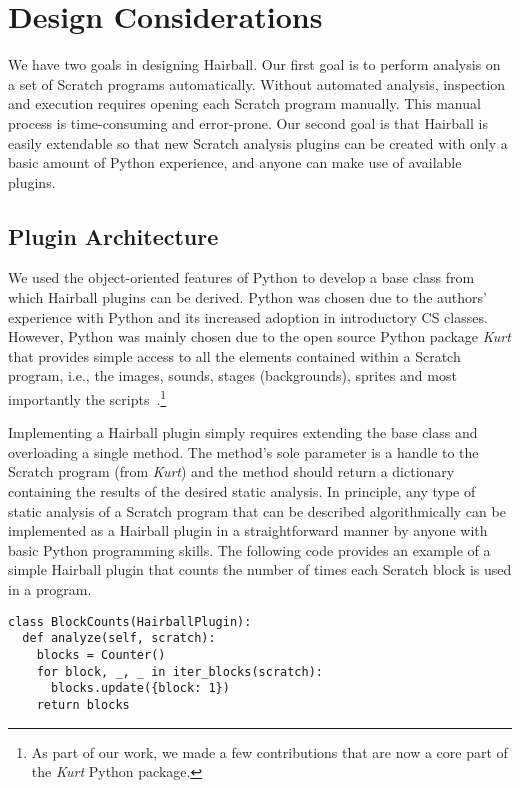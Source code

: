 \section{Design Considerations}

We have two goals in designing Hairball. Our first goal is to perform analysis
on a set of Scratch programs automatically. Without automated analysis,
inspection and execution requires opening each Scratch program manually. This
manual process is time-consuming and error-prone.  Our second goal is that
Hairball is easily extendable so that new Scratch analysis plugins can be
created with only a basic amount of Python experience, and anyone can make use
of available plugins.


\subsection*{Plugin Architecture}
We used the object-oriented features of Python to develop a base class from
which Hairball plugins can be derived. Python was chosen due to the authors'
experience with Python and its increased adoption in introductory CS
classes. However, Python was mainly chosen due to the open source Python
package \emph{Kurt} that provides simple access to all the elements contained
within a Scratch program, i.e., the images, sounds, stages (backgrounds),
sprites and most importantly the scripts~\cite{Radvan:2012:Online}.\footnote{As
  part of our work, we made a few contributions that are now a core part of the
  \emph{Kurt} Python package.}

Implementing a Hairball plugin simply requires extending the base class and
overloading a single method. The method's sole parameter is a handle to the
Scratch program (from \emph{Kurt}) and the method should return a dictionary
containing the results of the desired static analysis. In principle, any type
of static analysis of a Scratch program that can be described algorithmically
can be implemented as a Hairball plugin in a straightforward manner by anyone
with basic Python programming skills. The following code provides an example of
a simple Hairball plugin that counts the number of times each Scratch block is
used in a program.

\begin{verbatim}
class BlockCounts(HairballPlugin):
  def analyze(self, scratch):
    blocks = Counter()
    for block, _, _ in iter_blocks(scratch):
      blocks.update({block: 1})
    return blocks
\end{verbatim}
